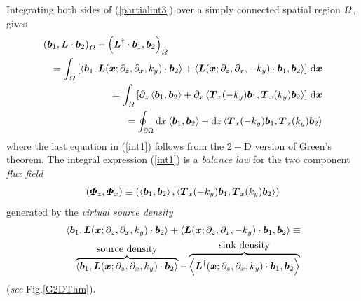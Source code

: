 Integrating both sides of (\ref{partialint3}) over a simply connected
spatial region ${\mit \Omega}$, gives 
\begin{eqnarray} 	\label{int1}
\lefteqn{
\left({{\bmi b}_{1},{\bmi L}\cdot{\bmi b}_{2}}\right)_{\mit \Omega}-
\left({{\bmi L}^{\dagger} \cdot{\bmi b}_{1},
{\bmi b}_{2}}\right)_{\mit \Omega}}\nonumber\\
&&=
\int_{\mit \Omega}  \left[
\left\langle{{\bmi b}_{1},{\bmi L}({\bmi x};{\partial }_{z},{\partial 
}_{x},{k}_{y}) \cdot{\bmi b}_{2}}\right\rangle 
+\left\langle{{\bmi L}({\bmi x};{\partial }_{z},{\partial 
}_{x},-{k}_{y}) \cdot{\bmi b}_{1},{\bmi b}_{2}}\right\rangle \right]\,{\rm d}{\bmi x} \nonumber\\
	&&=\int_{\mit \Omega} \left[
	{ \partial}_{z}\left\langle{{\bmi b}_{1},{\bmi b}_{2}}\right\rangle
	+ { \partial}_{x}\left\langle{{\bmi T}_x(- k_y){\bmi b}_{1},{\bmi T}_x ( k_y){\bmi 
	b}_{2}}\right\rangle \right]\, {\rm d}{\bmi x}\nonumber\\
	&&= \oint_{\partial\Omega} {\rm d}{x}
	\left\langle{{\bmi b}_{1},{\bmi b}_{2}}\right\rangle -
	{\rm d}{z} \left\langle{{\bmi T}_x(- k_y){\bmi b}_{1},{\bmi T}_x(k_y){\bmi b}_{2}}\right\rangle
\end{eqnarray}
where the last equation in (\ref{int1}) follows from the $2-$D version of Green's theorem.
The integral expression (\ref{int1}) is a {\em balance law\/} for the 
two component {\em flux field\/}
\[
({\mbox{\boldmath$\mit \Phi$\unboldmath}}_z,{\mbox{\boldmath$\mit \Phi$\unboldmath}}_x) \equiv (\left\langle{{\mbox{\boldmath$\mit b$\unboldmath}}_{1},{\mbox{\boldmath$\mit b$\unboldmath}}_{2}}\right\rangle,
\left\langle{{\mbox{\boldmath$\mit T$\unboldmath}}_x(- k_y){\mbox{\boldmath$\mit b$\unboldmath}}_{1},{\mbox{\boldmath$\mit T$\unboldmath}}_x( k_y){\mbox{\boldmath$\mit b$\unboldmath}}_{2}}\right\rangle )
\]
generated by the {\em virtual  source density\/}
\begin{eqnarray}
\lefteqn{	
\left\langle{{\bmi b}_{1},{\bmi L}({\bmi x};{\partial }_{z},{\partial 
}_{x},{k}_{y}) \cdot{\bmi 
	b}_{2}}\right\rangle
	+\left\langle{{\bmi L}({\bmi x};{\partial }_{z},{\partial 
}_{x},-{k}_{y}) \cdot{\bmi b}_{1},{\bmi 
b}_{2}}\right\rangle\equiv}\nonumber\\
&&	
\overbrace{\left\langle{{\bmi b}_{1},{\bmi L}({\bmi x};{\partial }_{z},{\partial 
}_{x},{k}_{y}) \cdot{\bmi 
	b}_{2}}\right\rangle}^{\mbox{source density}}-
\overbrace{\left\langle{{\bmi L}^{\dagger}({\bmi x};{\partial }_{z},{\partial 
}_{x},{k}_{y}) \cdot{\bmi b}_{1},{\bmi 
b}_{2}}\right\rangle}^{\mbox{sink density}}
\end{eqnarray}
({\em see\/} Fig.\ref{G2DThm}).

